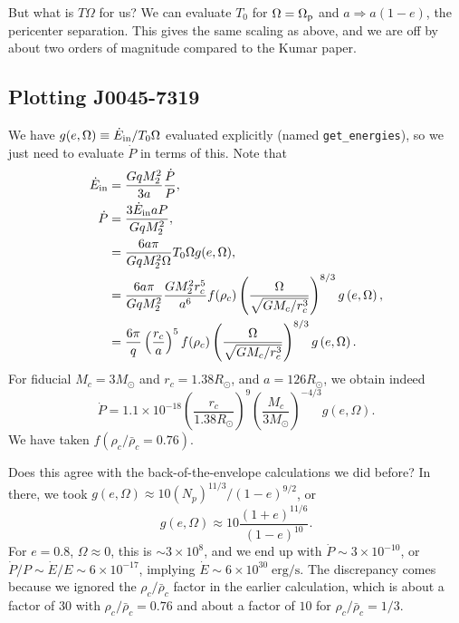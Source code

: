 \documentclass[11pt,
        usenames, %
        dvipsnames %
    ]{article}
\newcommand*{\scinot}[2]{#1\times10^{#2}}
\newcommand*{\p}[1]{\left(#1\right)}
\begin{document}
But what is $T \Omega$ for us? We can evaluate $T_0$ for $\Omega =
\Omega_{\rm p}$ and $a \Rightarrow a\p{1 - e}$, the pericenter separation. This
gives the same scaling as above, and we are off by about two orders of
magnitude compared to the Kumar paper.

\subsection{Plotting J0045-7319} %

We have $g(e, \Omega) \equiv \dot{E}_{\rm in} / T_0\Omega$ evaluated explicitly
(named \lstinline{get_energies}), so we just need to evaluate $\dot{P}$ in terms
of this. Note that
\begin{align}
    \dot{E}_{\rm in} &= \frac{G qM_2^2}{3a}\frac{\dot{P}}{P},\\
    \dot{P} &= \frac{3\dot{E}_{\rm in}aP}{GqM_2^2},\\
        &= \frac{6a\pi}{GqM_2^2 \Omega} T_0\Omega g(e, \Omega),\\
        &= \frac{6a \pi}{GqM_2^2} \frac{GM_2^2r_c^5}{a^6} f(\rho_c)
            \p{\frac{\Omega}{\sqrt{GM_c/r_c^3}}}^{8/3}g\p{e, \Omega},\\
        &= \frac{6\pi}{q} \p{\frac{r_c}{a}}^5 f(\rho_c)
            \p{\frac{\Omega}{\sqrt{GM_c/r_c^3}}}^{8/3}g\p{e, \Omega}.
\end{align}
For fiducial $M_c = 3M_{\odot}$ and $r_c = 1.38 R_{\odot}$, and $a =
126R_{\odot}$, we obtain indeed
\begin{equation}
    \dot{P} = \scinot{1.1}{-18} \p{\frac{r_c}{1.38 R_{\odot}}}^9
        \p{\frac{M_c}{3M_{\odot}}}^{-4/3} g\p{e, \Omega}.
\end{equation}
We have taken $f\p{\rho_c/\bar{\rho}_c = 0.76}$.

Does this agree with the back-of-the-envelope calculations we did before? In
there, we took $g\p{e, \Omega} \approx 10\p{N_p}^{11/3} / (1 - e)^{9/2}$, or
\begin{equation}
    g\p{e, \Omega} \approx 10\frac{\p{1 + e}^{11/6}}{(1 - e)^{10}}.
\end{equation}
For $e = 0.8$, $\Omega \approx 0$, this is $\sim \scinot{3}{8}$, and we end up
with $\dot{P} \sim \scinot{3}{-10}$, or $\dot{P} / P \sim \dot{E} / E \sim
6 \times 10^{-17}$, implying $\dot{E} \sim 6 \times 10^{30}\;\mathrm{erg/s}$.
The discrepancy comes because we ignored the $\rho_c / \bar{\rho}_c$ factor in
the earlier calculation, which is about a factor of $30$ with $\rho_c /
\bar{\rho}_c = 0.76$ and about a factor of $10$ for $\rho_c / \bar{\rho}_c =
1/3$.
\end{document}
